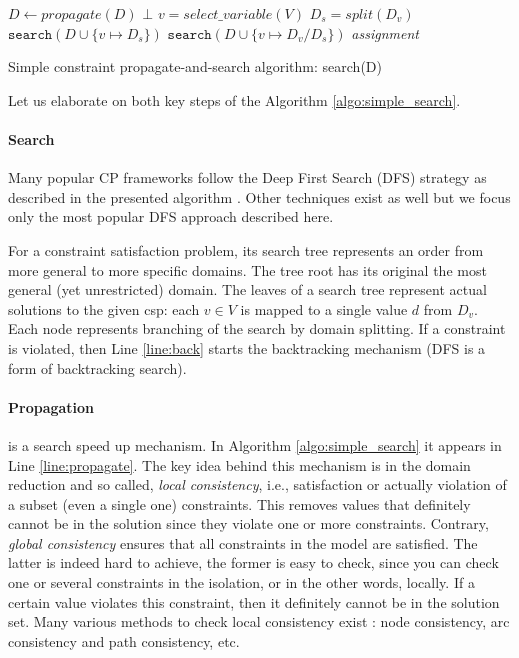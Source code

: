 \begin{algorithm}[t]
    \begin{algorithmic}[1]
        \footnotesize
        \State $D \gets \textit{propagate}(D)$ \label{line:propagate}
         \label{line:back}
        \State \Return $\bot$
        \EndIf
        \State $v = \textit{select\_variable}(V)$ 
        \State $D_s = \textit{split}(D_v)$  
        \State $\texttt{search}(D \cup \{ v \mapsto D_s \})$ 
        \State $\texttt{search}(D \cup \{ v \mapsto D_v / D_s \})$
        \Else
        \State \Return \textit{assignment}
        \EndIf
    \end{algorithmic}
    \caption{Simple constraint propagate-and-search algorithm: search(D)}
    \label{algo:simple_search}
\end{algorithm}

\pubrev
Let us elaborate on both key steps of the Algorithm \ref{algo:simple_search}.
\paragraph{Search} Many popular CP frameworks follow the Deep First Search (DFS) strategy as described in the presented algorithm \parencite{cp_propagation,handbookcp}. Other techniques exist as well \parencite{other_search_CP} but we focus only the most popular DFS approach described here.

For a constraint satisfaction problem, its search tree represents an order from more general to more specific domains. The tree root has its original the most general (yet unrestricted) domain. The leaves of a search tree represent actual solutions to the given \acrshort{csp}: each $v \in V$ is mapped to a single value $d$ from $D_v$. Each node represents branching of the search by domain splitting. If a constraint is violated, then Line \ref{line:back} starts the backtracking mechanism (DFS is a form of backtracking search).

\paragraph{Propagation} is a search speed up mechanism. In Algorithm \ref{algo:simple_search} it appears in Line \ref{line:propagate}. The key idea behind this mechanism is in the domain reduction and so called, \textit{local consistency}, i.e., satisfaction or actually violation of a subset (even a single one) constraints. This removes values that definitely cannot be in the solution since they violate one or more constraints. Contrary, \textit{global consistency} ensures that all constraints in the model are satisfied. The latter is indeed hard to achieve, the former is easy to check, since you can check one or several constraints in the isolation, or in the other words, locally. If a certain value violates this constraint, then it definitely cannot be in the solution set. Many various methods to check local consistency exist \parencite{cp_christian_local_consistency}: node consistency, arc consistency and path consistency, etc.

